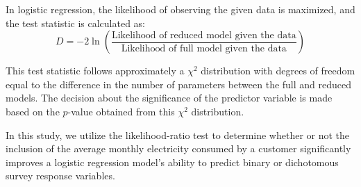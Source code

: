 In logistic regression, the likelihood of observing the given data is maximized, and the test statistic is calculated as:
\begin{equation}
    D = -2 \ln\left(\frac{\text{Likelihood of reduced model given the data}}{\text{Likelihood of full model given the data}}\right)
\end{equation}

This test statistic follows approximately a $\chi^2$ distribution with degrees of freedom equal to the difference in the number of parameters between the full and reduced models. The decision about the significance of the predictor variable is made based on the $p$-value obtained from this $\chi^2$ distribution.

In this study, we utilize the likelihood-ratio test to determine whether or not the inclusion of the average monthly electricity consumed by a customer significantly improves a logistic regression model's ability to predict binary or dichotomous survey response variables.